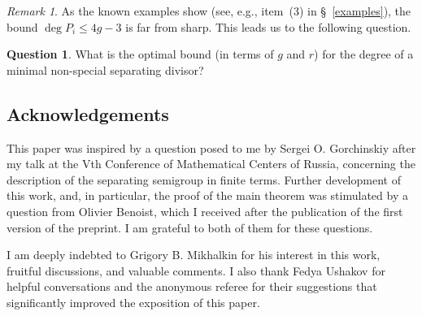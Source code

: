 \documentclass[x11names,oneside,11pt]{amsart}
\theoremstyle{definition}
\newtheorem{question}{Question}
\theoremstyle{remark}
\newtheorem{remark}{Remark}
\begin{document}
    \begin{remark}
    As the known examples show (see, e.g., item~(3) in \S~\ref{examples}), the bound $\deg P_i \leqslant 4g - 3$ is far from sharp. This leads us to the following question.
    \end{remark}

    \begin{question}
    What is the optimal bound (in terms of $g$ and $r$) for the degree of a minimal non-special separating divisor?
    \end{question}

    \subsection*{Acknowledgements}
    This paper was inspired by a question posed to me by Sergei O. Gorchinskiy after my talk at the Vth Conference of Mathematical Centers of Russia, concerning the description of the separating semigroup in finite terms. Further development of this work, and, in particular, the proof of the main theorem was stimulated by a question from Olivier Benoist, which I received after the publication of the first version of the preprint. I am grateful to both of them for these questions.

    I am deeply indebted to Grigory B. Mikhalkin for his interest in this work, fruitful discussions, and valuable comments. I also thank Fedya Ushakov for helpful conversations and the anonymous referee for their suggestions that significantly improved the exposition of this paper.


    
   
\end{document}
